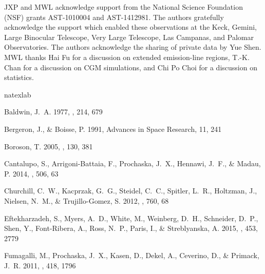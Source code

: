 \documentclass[iop]{emulateapj}
\begin{document}
\acknowledgements

JXP and MWL acknowledge support from the National Science Foundation (NSF) grants AST-1010004 and 
AST-1412981. The authors gratefully acknowledge the support which enabled these observations at 
the Keck, Gemini, Large Binocular Telescope, Very Large Telescope, Las Campanas, and Palomar 
Observatories. The authors acknowledge the sharing of private data by Yue Shen. MWL thanks Hai Fu
for a discussion on extended emission-line regions, T.-K. Chan for a discussion on CGM
simulations, and Chi Po Choi for a discussion on statistics.

%
%

\begin{thebibliography}{45}
\expandafter\ifx\csname natexlab\endcsname\relax\def\natexlab#1{#1}\fi

{Baldwin}, J.~A. 1977, \apj, 214, 679

{Bergeron}, J., \& {Boisse}, P. 1991, Advances in Space Research, 11, 241

{Boroson}, T. 2005, \aj, 130, 381

{Cantalupo}, S., {Arrigoni-Battaia}, F., {Prochaska}, J.~X., {Hennawi}, J.~F.,
  \& {Madau}, P. 2014, \nat, 506, 63

{Churchill}, C.~W., {Kacprzak}, G.~G., {Steidel}, C.~C., {Spitler}, L.~R.,
  {Holtzman}, J., {Nielsen}, N.~M., \& {Trujillo-Gomez}, S. 2012, \apj, 760, 68

{Eftekharzadeh}, S., {Myers}, A.~D., {White}, M., {Weinberg}, D.~H.,
  {Schneider}, D.~P., {Shen}, Y., {Font-Ribera}, A., {Ross}, N.~P., {Paris},
  I., \& {Streblyanska}, A. 2015, \mnras, 453, 2779

{Fumagalli}, M., {Prochaska}, J.~X., {Kasen}, D., {Dekel}, A., {Ceverino}, D.,
  \& {Primack}, J.~R. 2011, \mnras, 418, 1796


\end{thebibliography}
\end{document}
